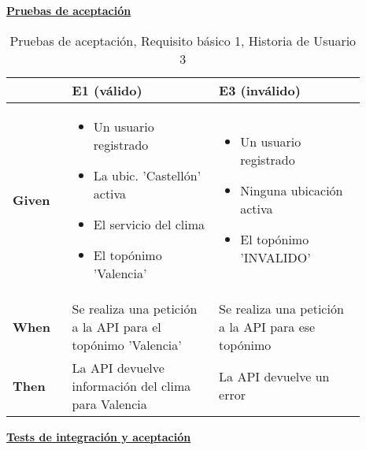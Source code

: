 \documentclass[../ei103948-project-documentation.tex]{subfiles}
\begin{document}
\begin{center}
				\textbf{\underline{Pruebas de aceptación}}
				\begin{table}[H]
					\centering
					\begin{tabular}{|p{0.15\linewidth}|p{0.37\linewidth}|p{0.37\linewidth}|}
					\hline
					\textbf{}      & \textbf{E1 (válido)}                                                             & \textbf{E3 (inválido)}                                                  \\ \hline
					\textbf{Given} & \begin{itemize}\vspace{-5mm}\setlength\itemsep{0mm}\setlength\parskip{0mm}\setlength{\itemindent}{-5mm}
						\item Un usuario registrado
						\item La ubic. 'Castellón' activa
						\item El servicio del clima
						\item El topónimo 'Valencia'
					\end{itemize}
					& \begin{itemize}\vspace{-5mm}\setlength\itemsep{0mm}\setlength\parskip{0mm}\setlength{\itemindent}{-5mm}
						\item Un usuario registrado
						\item Ninguna ubicación activa
						\item El topónimo 'INVALIDO'
					\end{itemize}\\ \hline
					\textbf{When}  & Se realiza una petición a la API para el topónimo 'Valencia'                     & Se realiza una petición a la API para ese topónimo                      \\ \hline
					\textbf{Then}  & La API devuelve información del clima para Valencia                                                     & La API devuelve un error                                                \\ \hline
					\end{tabular}
					\caption{Pruebas de aceptación, Requisito básico 1, Historia de Usuario 3}
				\end{table}
				\end{center}

				\begin{center}
					\textbf{\underline{Tests de integración y aceptación}}
				\end{center}

				\testBasicoC
\end{document}

